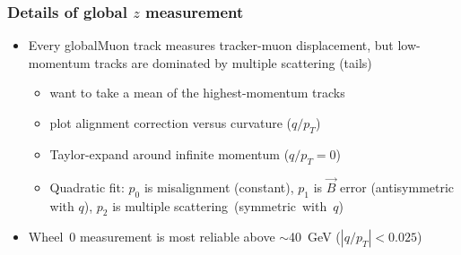\documentclass[compress]{beamer}
\begin{document}
\begin{frame}
\frametitle{Details of global $z$ measurement}
\begin{itemize}
\item Every globalMuon track measures tracker-muon displacement, but
  low-momentum tracks are dominated by multiple scattering (tails)
\begin{itemize}
\item want to take a mean of the highest-momentum tracks
\item plot alignment correction versus curvature ($q/p_T$)
\item Taylor-expand around infinite momentum ($q/p_T = 0$)
\item Quadratic fit: $p_0$ is misalignment (constant), $p_1$ is $\vec{B}$ error (antisymmetric with $q$), $p_2$ is multiple \mbox{scattering (symmetric with $q$)\hspace{-1 cm}}
\end{itemize}

\item Wheel~0 measurement is most reliable above $\sim$40~GeV \mbox{($|q/p_T| < 0.025$)\hspace{-1 cm}}
\end{itemize}


\end{frame}
\end{document}
